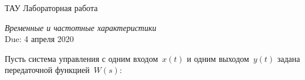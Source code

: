 \documentclass[a4paper,oneside,10pt]{book}
\theoremstyle{definition}
\begin{document}
\begin{center}
{\large  ТАУ \hspace{0.1cm} Лабораторная работа }

\vspace{5pt}
\textit{\large Временные и частотные характеристики}\\ %
\vspace{10pt}
Due: 4 апреля 2020 %
\end{center}

\vspace{0.2 cm}



Пусть система управления с одним входом~$ x(t) $ и одним выходом~$ y(t) $ задана  передаточной функцией~$ W(s) $: 
\end{document}
